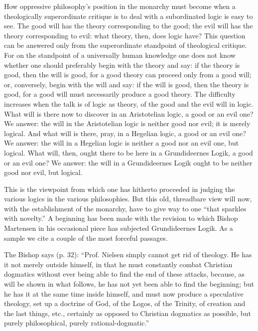 \documentclass[12pt]{book}
\newcommand{\opage}[1]{\marginnote{\footnotesize\textit{[#1]}}}
\begin{document}
How oppressive philosophy's position in the monarchy must become when a theologically superordinate critique is to deal with a subordinated logic is easy to see. The good will has
\opage{114}\setcounter{footnote}{0}%
the theory corresponding to the good; the evil will has the theory corresponding to evil: what theory, then, does logic have? This question can be answered only from the superordinate standpoint of theological critique. For on the standpoint of a universally human knowledge one does not know whether one should preferably begin with the theory and say: if the theory is good, then the will is good, for a good theory can proceed only from a good will; or, conversely, begin with the will and say: if the will is good, then the theory is good, for a good will must necessarily produce a good theory. The difficulty increases when the talk is of logic as theory, of the good and the evil will in logic. What will is there now to discover in an Aristotelian logic, a good or an evil one? We answer: the will in the Aristotelian logic is neither good nor evil; it is merely logical. And what will is there, pray, in a Hegelian logic, a good or an evil one? We answer: the will in a Hegelian logic is neither a good nor an evil one, but logical. What will, then, ought there to be here in a Grundideernes Logik, a good or an evil one? We answer: the will in a Grundideernes Logik ought to be neither good nor evil, but logical.

This is the viewpoint from which one has hitherto proceeded in judging the various logics in the various philosophies. But this old, threadbare view will now, with the establishment of the monarchy, have to give way to one ``that sparkles with novelty.'' A beginning has been made with the revision to which Bishop Martensen in his occasional piece has subjected Grundideernes Logik. As a sample we cite a couple of the most forceful passages.

The Bishop says (p. 32): ``Prof. Nielsen simply cannot get rid of theology. He has it not merely outside himself, in that he must constantly combat Christian dogmatics without ever being able to find the end of these attacks, because, as will be shown in what follows, he has not yet been able to find the beginning; but he has it at the same time inside
\opage{115}\setcounter{footnote}{0}%
himself, and must now produce a speculative theology, set up a doctrine of God, of the Logos, of the Trinity, of creation and the last things, etc., certainly as opposed to Christian dogmatics as possible, but purely philosophical, purely rational-dogmatic.''
\end{document}
